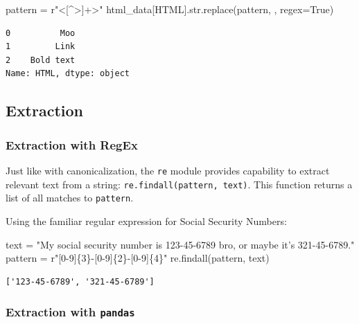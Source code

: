 \documentclass[
  letterpaper,
  DIV=11,
  numbers=noendperiod]{scrreprt}
\newenvironment{Shaded}{\begin{snugshade}}{\end{snugshade}}
\newcommand{\BuiltInTok}[1]{\textcolor[rgb]{0.00,0.23,0.31}{#1}}
\newcommand{\NormalTok}[1]{\textcolor[rgb]{0.00,0.23,0.31}{#1}}
\newcommand{\OperatorTok}[1]{\textcolor[rgb]{0.37,0.37,0.37}{#1}}
\newcommand{\SpecialCharTok}[1]{\textcolor[rgb]{0.37,0.37,0.37}{#1}}
\newcommand{\StringTok}[1]{\textcolor[rgb]{0.13,0.47,0.30}{#1}}
\newcommand{\VariableTok}[1]{\textcolor[rgb]{0.07,0.07,0.07}{#1}}
\newcommand{\VerbatimStringTok}[1]{\textcolor[rgb]{0.13,0.47,0.30}{#1}}
\begin{document}
\begin{Shaded}
\begin{Highlighting}[]
\NormalTok{pattern }\OperatorTok{=} \VerbatimStringTok{r"\textless{}[\^{}\textgreater{}]+\textgreater{}"}
\NormalTok{html\_data[}\StringTok{\textquotesingle{}HTML\textquotesingle{}}\NormalTok{].}\BuiltInTok{str}\NormalTok{.replace(pattern, }\StringTok{\textquotesingle{}\textquotesingle{}}\NormalTok{, regex}\OperatorTok{=}\VariableTok{True}\NormalTok{)}
\end{Highlighting}
\end{Shaded}

\begin{verbatim}
0          Moo
1         Link
2    Bold text
Name: HTML, dtype: object
\end{verbatim}

\subsection{Extraction}\label{extraction-1}

\subsubsection{Extraction with RegEx}\label{extraction-with-regex}

Just like with canonicalization, the \texttt{re} module provides
capability to extract relevant text from a string:
\texttt{re.findall(pattern,\ text)}. This function returns a list of all
matches to \texttt{pattern}.

Using the familiar regular expression for Social Security Numbers:

\begin{Shaded}
\begin{Highlighting}[]
\NormalTok{text }\OperatorTok{=} \StringTok{"My social security number is 123{-}45{-}6789 bro, or maybe it’s 321{-}45{-}6789."}
\NormalTok{pattern }\OperatorTok{=} \VerbatimStringTok{r"[0{-}9]}\SpecialCharTok{\{3\}}\VerbatimStringTok{{-}[0{-}9]}\SpecialCharTok{\{2\}}\VerbatimStringTok{{-}[0{-}9]}\SpecialCharTok{\{4\}}\VerbatimStringTok{"}
\NormalTok{re.findall(pattern, text)  }
\end{Highlighting}
\end{Shaded}

\begin{verbatim}
['123-45-6789', '321-45-6789']
\end{verbatim}

\subsubsection{\texorpdfstring{Extraction with
\texttt{pandas}}{Extraction with pandas}}\label{extraction-with-pandas}
\end{document}
